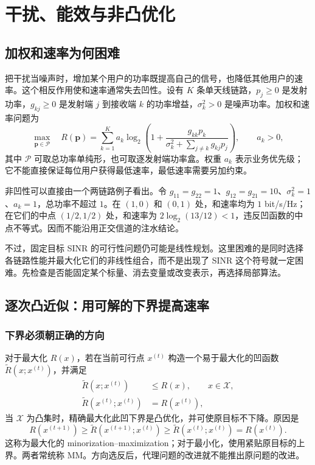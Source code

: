 \chapter{干扰、能效与非凸优化}
\label{ch:nonconvex}

\section{加权和速率为何困难}

把干扰当噪声时，增加某个用户的功率既提高自己的信号，也降低其他用户的速率。这个相反作用使和速率通常失去凹性。设有 $K$ 条单天线链路，$p_j\geq0$ 是发射功率，$g_{kj}\geq0$ 是发射端 $j$ 到接收端 $k$ 的功率增益，$\sigma_k^2>0$ 是噪声功率。加权和速率问题为
\begin{equation}
 \max_{\bm p\in\mathcal P}\quad
 R(\bm p)=\sum_{k=1}^K a_k\log_2\left(1+
 \frac{g_{kk}p_k}{\sigma_k^2+\sum_{j\ne k}g_{kj}p_j}\right),
 \qquad a_k>0,
 \label{eq:wsr-power}
\end{equation}
其中 $\mathcal P$ 可取总功率单纯形，也可取逐发射端功率盒。权重 $a_k$ 表示业务优先级；它不能直接保证每位用户获得最低速率，最低速率需要另加约束。

非凹性可以直接由一个两链路例子看出。令 $g_{11}=g_{22}=1$、$g_{12}=g_{21}=10$、$\sigma_k^2=1$、$a_k=1$，总功率不超过 $1$。在 $(1,0)$ 和 $(0,1)$ 处，和速率均为 $1$ bit/s/Hz；在它们的中点 $(1/2,1/2)$ 处，和速率为 $2\log_2(13/12)<1$，违反凹函数的中点不等式。因而不能沿用正交信道的注水结论。

不过，固定目标 SINR 的可行性问题仍可能是线性规划。这里困难的是同时选择各链路性能并最大化它们的非线性组合，而不是出现了 SINR 这个符号就一定困难。先检查是否能固定某个标量、消去变量或改变表示，再选择局部算法。

\section{逐次凸近似：用可解的下界提高速率}
\label{sec:sca}

\subsection{下界必须朝正确的方向}

对于最大化 $R(x)$，若在当前可行点 $x^{(t)}$ 构造一个易于最大化的凹函数 $\widetilde R(x;x^{(t)})$，并满足
\begin{align}
 \widetilde R(x;x^{(t)})&\leq R(x),\qquad x\in\mathcal X,
 \label{eq:mm-lower}\\
 \widetilde R(x^{(t)};x^{(t)})&=R(x^{(t)}),
 \label{eq:mm-touch}
\end{align}
当 $\mathcal X$ 为凸集时，精确最大化此凹下界是凸优化，并可使原目标不下降。原因是
\begin{equation}
 R(x^{(t+1)})\geq \widetilde R(x^{(t+1)};x^{(t)})
 \geq \widetilde R(x^{(t)};x^{(t)})=R(x^{(t)}).
 \label{eq:mm-monotonic}
\end{equation}
这称为最大化的 minorization--maximization；对于最小化，使用紧贴原目标的上界。两者常统称 MM。方向选反后，代理问题的改进就不能推出原问题的改进。

